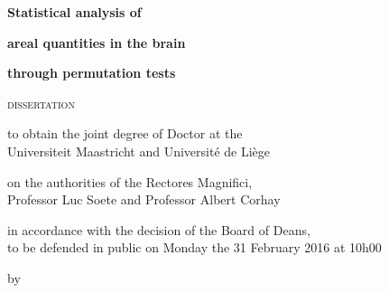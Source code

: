 \pagestyle{empty}
\vspace*{3cm}
\vspace*{\fill}
\begin{center}
\begin{Huge}
\textbf{Statistical analysis of}
\end{Huge}

\vspace{2mm}

\begin{Huge}
\textbf{areal quantities in the brain}
\end{Huge}

\vspace{2mm}

\begin{Huge}
\textbf{through permutation tests}
\end{Huge}
\end{center}

\vfill

\begin{center}
\textsc{dissertation}

\vfill

to obtain the joint degree of Doctor at the\\
Universiteit Maastricht and Universit\'{e} de Li\`{e}ge

\vfill

on the authorities of the Rectores Magnifici,\\
Professor Luc Soete and Professor Albert Corhay

\vfill

in accordance with the decision of the Board of Deans,\\
to be defended in public on Monday the 31 February 2016 at 10h00

\vfill

by
\end{center}

\vfill

